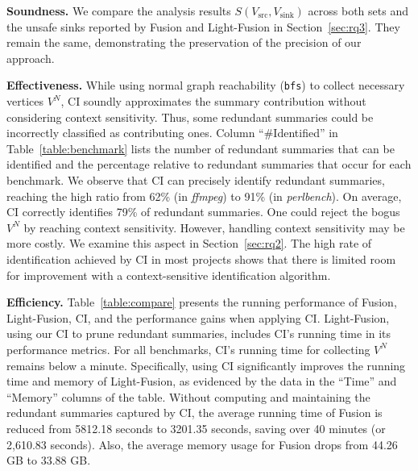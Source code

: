 \textbf{Soundness.}
We compare the analysis results $S(V_{\text{src}}, V_{\text{sink}})$ across both sets and the unsafe sinks reported by Fusion and Light-Fusion in Section~\ref{sec:rq3}. 
They remain the same, demonstrating the preservation of the precision of our approach.

\textbf{Effectiveness.}
While using normal graph reachability (\texttt{bfs}) to collect necessary vertices $V^{N}$, CI soundly approximates the summary contribution without considering context sensitivity. 
Thus, some redundant summaries could be incorrectly classified as contributing ones. 
Column ``\#Identified'' in Table~\ref{table:benchmark} lists the number of redundant summaries that can be identified and the percentage relative to redundant summaries that occur for each benchmark.
We observe that CI can precisely identify redundant summaries, reaching the high ratio from 62\% (in \textit{ffmpeg}) to 91\% (in \textit{perlbench}). 
On average, CI correctly identifies 79\% of redundant summaries.
One could reject the bogus $V^{N}$ by reaching context sensitivity.
However, handling context sensitivity may be more costly. 
We examine this aspect in Section~\ref{sec:rq2}. 
The high rate of identification achieved by CI in most projects shows that there is limited room for improvement with a context-sensitive identification algorithm.


\textbf{Efficiency.}
Table~\ref{table:compare} presents the running performance of Fusion, Light-Fusion, CI, and the performance gains when applying CI.
Light-Fusion, using our CI to prune redundant summaries, includes CI's running time in its performance metrics.
For all benchmarks, CI's running time for collecting $V^{N}$ remains below a minute.
Specifically, using CI significantly improves the running time and memory of Light-Fusion, as evidenced by the data in the ``Time'' and ``Memory'' columns of the table.
Without computing and maintaining the redundant summaries captured by CI, 
the average running time of Fusion is reduced from 5812.18 seconds to 3201.35 seconds, saving over 40 minutes (or 2,610.83 seconds).
Also, the average memory usage for Fusion drops from 44.26 GB to 33.88 GB.


